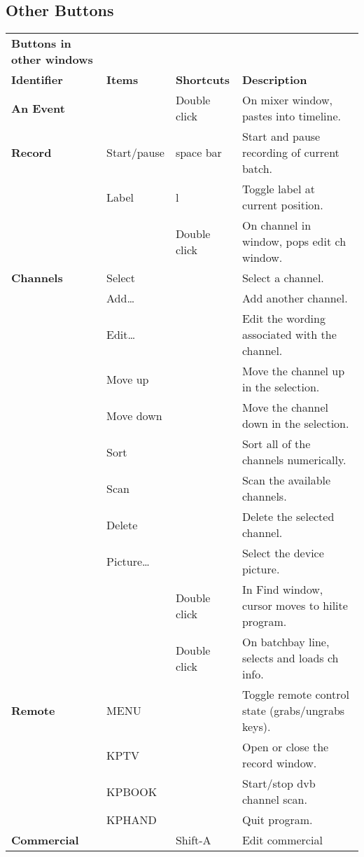 \subsection*{Other Buttons }%
\label{ssec:other_buttons}

\begin{longtable}[h]{>{\bfseries}p{}p{}p{}p{}}
  \toprule
  \multicolumn{4}{c}%
  {\textcolor{CinRed}{\textbf{Buttons in other windows}}} \\
  Identifier & \textbf{Items} & \textbf{Shortcuts} & \textbf{Description}\\
  \midrule
  \endhead
  \textcolor{CinBlueText}{An Event} &  & Double click & On mixer window, pastes into timeline. \\
  \midrule
  \textcolor{CinBlueText}{Record} & Start/pause & space bar & Start and pause recording of current batch. \\
  & Label & l & Toggle label at current position. \\
  &  & Double click & On channel in window, pops edit ch window. \\
  \midrule
  \textcolor{CinBlueText}{Channels} & Select &  & Select a channel. \\
  & Add\dots &  & Add another channel. \\
  & Edit\dots &  & Edit the wording associated with the channel. \\
  & Move up &  & Move the channel up in the selection. \\
  & Move down &  & Move the channel down in the selection. \\
  & Sort &  & Sort all of the channels numerically. \\
  & Scan &  & Scan the available channels. \\
  & Delete &  & Delete the selected channel. \\
  & Picture\dots &  & Select the device picture. \\
  &  & Double click & In Find window, cursor moves to hilite program. \\
  &  & Double click & On batchbay line, selects and loads ch info. \\
  \midrule
  \textcolor{CinBlueText}{Remote} & MENU &  & Toggle remote control state (grabs/ungrabs keys). \\
  & KPTV &  & Open or close the record window. \\
  & KPBOOK &  & Start/stop dvb channel scan. \\
  & KPHAND &  & Quit \CGG{} program. \\
  \midrule
  \textcolor{CinBlueText}{Commercial} &  & Shift-A & Edit commercial\\
  \bottomrule
\end{longtable}


